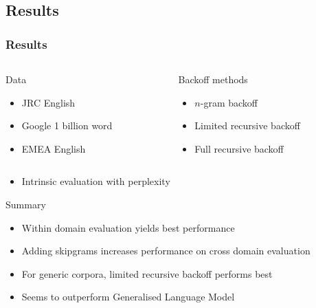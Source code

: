 \documentclass{beamer}
\begin{document}
\begin{frame}\section{Results}
    \frametitle{Results}

    \begin{columns}
        \begin{column}{0.5\textwidth}
            \begin{block}{Data}
                \begin{itemize}
                    \item JRC English
                    \item Google 1 billion word
                    \item EMEA English
                \end{itemize}
            \end{block}
        \end{column}    
        \begin{column}{0.5\textwidth}
            \begin{block}{Backoff methods}
                \begin{itemize}
                    \item $n$-gram backoff
                    \item Limited recursive backoff
                    \item Full recursive backoff
                \end{itemize}
            \end{block}
        \end{column}    
    \end{columns}

    \begin{itemize}
        \item Intrinsic evaluation with perplexity
    \end{itemize}

    \begin{block}{Summary}
        \begin{itemize}
            \item Within domain evaluation yields best performance
            \item Adding skipgrams increases performance on cross domain evaluation
            \item For generic corpora, limited recursive backoff performs best
            \item Seems to outperform Generalised Language Model
        \end{itemize}
    \end{block}
\end{frame}
\end{document}

